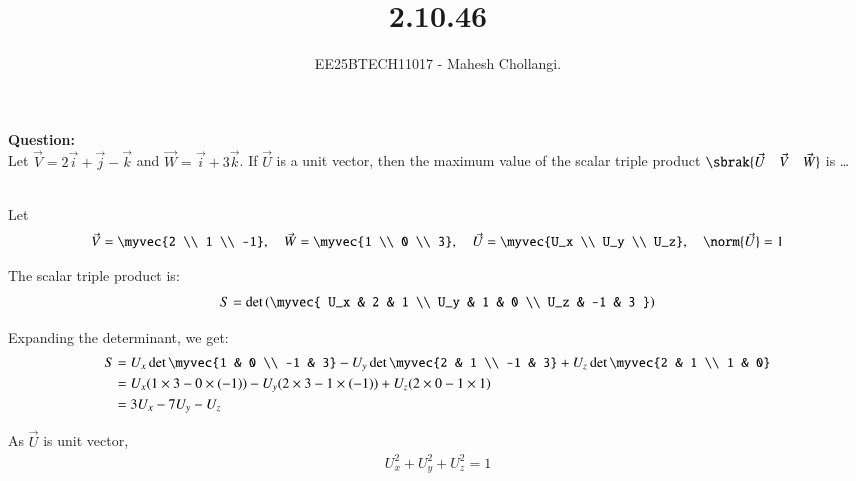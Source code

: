 \documentclass[journal]{IEEEtran}
\begin{document}


\title{2.10.46}
\author{EE25BTECH11017 - Mahesh Chollangi.}
{\let\newpage\relax\maketitle}

\renewcommand{\thefigure}{\theenumi}
\renewcommand{\thetable}{\theenumi}
\setlength{\intextsep}{10pt}

\renewcommand{\thetable}{\theenumi}

\textbf{Question:} \\
Let \(\vec{V} = 2\vec{i} + \vec{j} - \vec{k}\) and \(\vec{W} = \vec{i} + 3\vec{k}\). If \(\vec{U}\) is a unit vector, then the maximum value of the scalar triple product \(\sbrak{\vec{U} \quad \vec{V} \quad \vec{W}}\) is \dots

\solution \\

Let 
\begin{align}
\vec{V} = \myvec{2 \\ 1 \\ -1}, \quad \vec{W} = \myvec{1 \\ 0 \\ 3}, \quad \vec{U} = \myvec{U_x \\ U_y \\ U_z}, \quad \norm{\vec{U}} = 1
\end{align}

The scalar triple product is:
\begin{align}
S = \det\left(
\myvec{
U_x & 2 & 1 \\
U_y & 1 & 0 \\
U_z & -1 & 3
}
\right)
\end{align}

Expanding the determinant, we get:
\begin{align}
S &= U_x \det \myvec{1 & 0 \\ -1 & 3} - U_y \det \myvec{2 & 1 \\ -1 & 3} + U_z \det \myvec{2 & 1 \\ 1 & 0} \\
&= U_x (1 \times 3 - 0 \times (-1)) - U_y (2 \times 3 - 1 \times (-1)) + U_z (2 \times 0 - 1 \times 1) \\
&= 3U_x - 7U_y - U_z
\end{align}

As \(\vec{U}\) is unit vector,
\begin{align}
U_x^2 + U_y^2 + U_z^2 = 1
\end{align}
\end{document}
